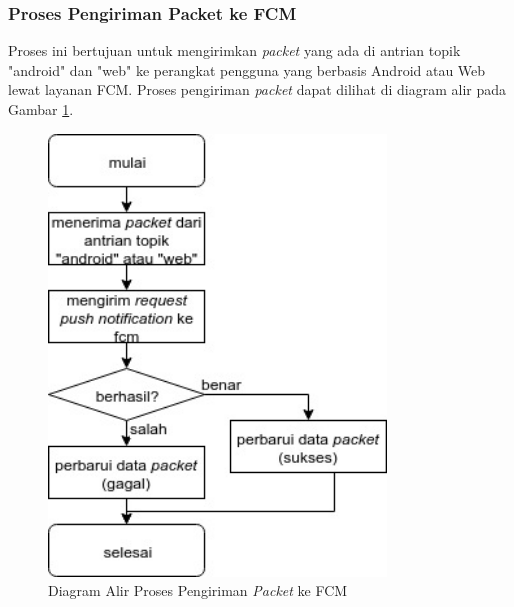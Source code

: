 \subsubsection{Proses Pengiriman Packet ke FCM}
\par Proses ini bertujuan untuk mengirimkan \textit{packet} yang ada di antrian topik "android" dan "web" ke perangkat pengguna yang berbasis Android atau Web lewat layanan FCM. Proses pengiriman \textit{packet} dapat dilihat di diagram alir pada Gambar \ref{flowchart_pengiriman_packet_ke_fcm}.
\begin{figure}[H]
	\centering\includegraphics[width=0.8\textwidth]{bab3/img/flowchart-pengiriman_packet_ke_fcm.jpg}
	\caption{Diagram Alir Proses Pengiriman \textit{Packet} ke FCM} \label{flowchart_pengiriman_packet_ke_fcm}
\end{figure}

\clearpage
